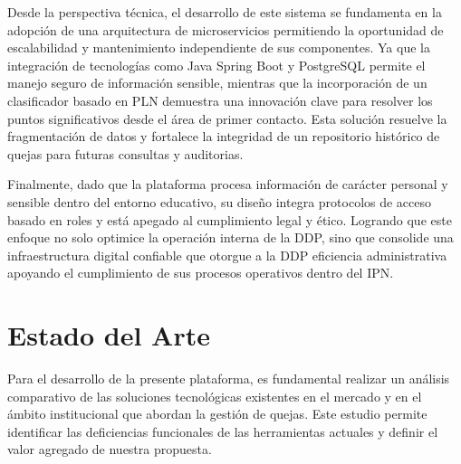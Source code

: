        Desde la perspectiva técnica, el desarrollo de este sistema se fundamenta en la adopción de una arquitectura de microservicios permitiendo la oportunidad de escalabilidad y mantenimiento independiente de sus componentes. Ya que la integración de tecnologías como Java Spring Boot y PostgreSQL permite el manejo seguro de información sensible, mientras que la incorporación de un clasificador basado en PLN demuestra una innovación clave para resolver los puntos significativos desde el área de primer contacto. Esta solución resuelve la fragmentación de datos y fortalece la integridad de un repositorio histórico de quejas para futuras consultas y auditorias.
        
        Finalmente, dado que la plataforma procesa información de carácter personal y sensible dentro del entorno educativo, su diseño integra protocolos de acceso basado en roles y está apegado al cumplimiento legal y ético. Logrando que este enfoque no solo optimice la operación interna de la DDP, sino que consolide una infraestructura digital confiable que otorgue a la DDP eficiencia administrativa apoyando el cumplimiento de sus procesos operativos dentro del IPN.

    \section{Estado del Arte}

        Para el desarrollo de la presente plataforma, es fundamental realizar un análisis comparativo de las soluciones tecnológicas existentes en el mercado y en el ámbito institucional que abordan la gestión de quejas. Este estudio permite identificar las deficiencias funcionales de las herramientas actuales y definir el valor agregado de nuestra propuesta.
        
